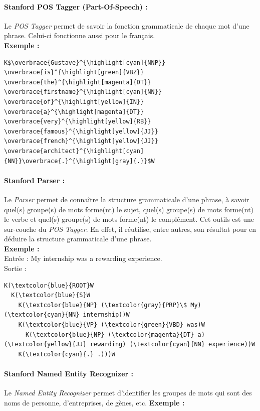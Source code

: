             \paragraph{Stanford POS Tagger (Part-Of-Speech) :}
                Le \textit{POS Tagger} permet de savoir la fonction grammaticale de chaque mot d'une phrase. Celui-ci fonctionne aussi pour le français.\\
                \textbf{Exemple :}
\begin{lstlisting}
K$\overbrace{Gustave}^{\highlight[cyan]{NNP}} \overbrace{is}^{\highlight[green]{VBZ}} \overbrace{the}^{\highlight[magenta]{DT}} \overbrace{firstname}^{\highlight[cyan]{NN}} \overbrace{of}^{\highlight[yellow]{IN}} \overbrace{a}^{\highlight[magenta]{DT}} \overbrace{very}^{\highlight[yellow]{RB}} \overbrace{famous}^{\highlight[yellow]{JJ}} \overbrace{french}^{\highlight[yellow]{JJ}} \overbrace{architect}^{\highlight[cyan]{NN}}\overbrace{.}^{\highlight[gray]{.}}$W
\end{lstlisting}
            \paragraph{Stanford Parser :}
                Le \textit{Parser} permet de connaître la structure grammaticale d'une phrase, à savoir quel(s) groupe(s) de mots forme(nt) le sujet, quel(s) groupe(s) de mots forme(nt) le verbe et quel(s) groupe(s) de mots forme(nt) le complément. Cet outils est une sur-couche du \textit{POS Tagger}. En effet, il réutilise, entre autres, son résultat pour en déduire la structure grammaticale d'une phrase.\\
                \textbf{Exemple :}\\
                Entrée : \og My internship was a rewarding experience.\fg\\
                Sortie :
\begin{lstlisting}
K(\textcolor{blue}{ROOT}W
  K(\textcolor{blue}{S}W
    K(\textcolor{blue}{NP} (\textcolor{gray}{PRP}\$ My) (\textcolor{cyan}{NN} internship))W
    K(\textcolor{blue}{VP} (\textcolor{green}{VBD} was)W
      K(\textcolor{blue}{NP} (\textcolor{magenta}{DT} a) (\textcolor{yellow}{JJ} rewarding) (\textcolor{cyan}{NN} experience))W
    K(\textcolor{cyan}{.} .)))W
\end{lstlisting}

            \paragraph{Stanford Named Entity Recognizer :}
                Le \textit{Named Entity Recognizer} permet d'identifier les groupes de mots qui sont des noms de personne, d'entreprises, de gènes, etc.
                \textbf{Exemple :}

